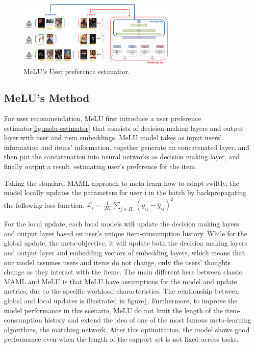 \begin{figure}[H] 
    \centering 
    \includegraphics[width=0.7\textwidth]{image/MeLU-update.png} 
    \caption{MeLU's User preference estimatior.}
    \label{fig:melu-updates} 
\end{figure}


\subsection{MeLU's Method}
For user recommendation, MeLU first introduce a user preference estimator\ref{fig:melu-estimator} that consists of decision-making layers and output layer with user and item embeddings. MeLU model takes as input users' information and items' information, together generate an concatenated layer, and then put the concatenation into neural networks as decision making layer, and finally output a result, estimating user's preference for the item. 

Taking the standard MAML approach to meta-learn how to adapt swiftly, the model locally updates the parameters for user i in the batch by backpropagating the following loss function. 
$\mathcal{L}_i = \frac{1}{\left | H_i \right | } \sum_{j\in H_i} (y_{ij} - \hat{y}_{ij})^2 $

For the local update, each local models will update the decision making layers and output layer based on user's unique item-consumption history. While for the global update, the meta-objective, it will update both the decision making layers and output layer and embedding vectors of embedding layers, which means that our model assumes users and items do not change, only the users’ thoughts change as they interact with the items. The main different here between classic MAML and MeLU is that MeLU have assumptions for the model and update metrics, due to the specific workload characteristics. The relationship between global and local updates is illustrated in figure\ref{fig:melu-updates}. Furthermore, to improve the model performance in this scenario, MeLU do not limit the length of the item-consumption history and extend the idea of one of the most famous meta-learning algorithms, the matching network. After this optimization, the model shows good performance even when the length of the support set is not fixed across tasks.

